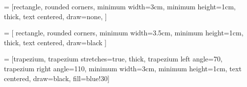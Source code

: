 \newcommand{\mkTrellisInsert}[1]{
  \begin{tikzpicture}
    \setcounter{i}{0}
    \setcounter{z}{0}
    \setcounter{xn}{0}
    \setcounter{xnn}{0}
    \stepcounter{i}
    \node[circle, draw] (\arabic{i}) at (0,0){};
    \foreach [count=\i] \x in {2,...,#1}{
      \pgfmathsetmacro{\lox}{\x-1}%
      \pgfmathsetmacro{\loxt}{\x-3}%
      \foreach [count=\j] \xx in {-\lox,-\loxt,...,\lox}{
        \pgfmathsetmacro{\jj}{\j-1}%
        \stepcounter{i}
        \pgfmathsetmacro{\mp}{\xx+#1}%
        \pgfmathsetmacro{\mq}{\xx+\x}%
        \pgfmathsetmacro{\lbl}{\lox!/(\jj!*(\lox-\jj)!)}
        \ifnum\x>\mp
        \pgfmath\node[circle, draw, fill=black!30]  (\arabic{i}) at (\xx*\dx, -\lox*\dy) {};
        \else
        \ifnum#1<\mq
        \pgfmath\node[circle, draw, fill=black!30]  (\arabic{i}) at (\xx*\dx, -\lox*\dy) {};
        \else
        \pgfmath\node[circle, draw]  (\arabic{i}) at (\xx*\dx, -\lox*\dy) {};
        \fi
        \fi

      }
    }
    \pgfmathsetmacro{\maxx}{#1 - 1}
    \foreach \x in {1,...,\maxx}{
      \foreach \xx in {1,...,\x}{
        \stepcounter{z}
        \setcounter{xn}{\arabic{z}}
        \addtocounter{xn}{\x}
        \setcounter{xnn}{\arabic{xn}}
        \stepcounter{xnn}
        \draw [<-] (\arabic{z}) -- (\arabic{xn});
        \draw [<-] (\arabic{z}) -- (\arabic{xnn});
      }
    }
  \end{tikzpicture}
}

\usetikzlibrary{automata, positioning, arrows}

\newcommand{\nobarfrac}{\genfrac{}{}{0pt}{}}
\loctimings
{}\unloctimings
{}\naturalerrors
{}\syntheticerrors

\usepackage[all,pdf]{xy}

\newcommand{\bs}{\blacksquare}
\newcommand{\ws}{\square}

\usepackage{multicol}
\usetikzlibrary{shapes.geometric, arrows}

 = [rectangle, rounded corners,
minimum width=3cm,
minimum height=1cm,
thick,
text centered,
draw=none,
]

 = [
rectangle,
rounded corners,
minimum width=3.5cm,
minimum height=1cm,
thick,
text centered,
draw=black
]

 = [trapezium,
trapezium stretches=true, %
thick,
trapezium left angle=70,
trapezium right angle=110,
minimum width=3cm,
minimum height=1cm, text centered,
draw=black, fill=blue!30]

